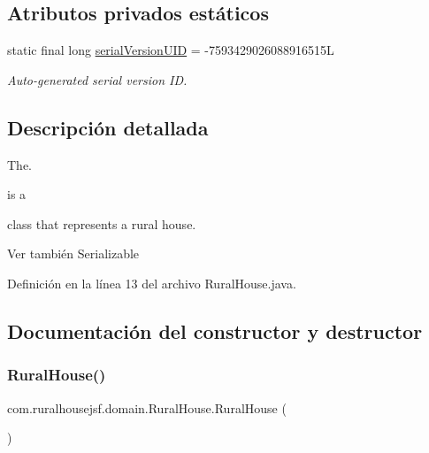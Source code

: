 \subsection*{Atributos privados estáticos}
\begin{DoxyCompactItemize}
\item 
static final long \mbox{\hyperlink{a00188_a2ef1095a366b8e08e491c70cd421b907}{serial\+Version\+U\+ID}} = -\/7593429026088916515L
\begin{DoxyCompactList}\small\item\em Auto-\/generated serial version ID. \end{DoxyCompactList}\end{DoxyCompactItemize}


\subsection{Descripción detallada}
The. 


\begin{DoxyCode}{0}
\end{DoxyCode}
 is a
\begin{DoxyCode}{0}
\end{DoxyCode}
 class that represents a rural house.

\begin{DoxySeeAlso}{Ver también}
Serializable 
\end{DoxySeeAlso}


Definición en la línea 13 del archivo Rural\+House.\+java.



\subsection{Documentación del constructor y destructor}
\mbox{\label{a00188_a6312a6b35355d7883853544db74662f8}} 
\subsubsection{\texorpdfstring{RuralHouse()}{RuralHouse()}\hspace{0.1cm}{\footnotesize\ttfamily [1/3]}}
{\footnotesize\ttfamily com.\+ruralhousejsf.\+domain.\+Rural\+House.\+Rural\+House (\begin{DoxyParamCaption}{ }\end{DoxyParamCaption})\hspace{0.3cm}{\ttfamily [package]}}



